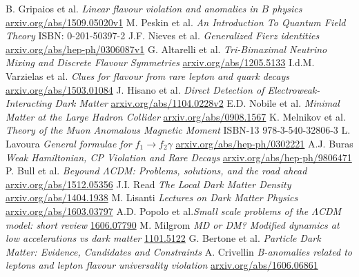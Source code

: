 \documentclass[11pt,a4paper,twoside]{article}
\numberwithin{equation}{section}
\begin{document}
\begin{thebibliography}{xxx}
 B. Gripaios et al. \textit{Linear flavour violation and anomalies in $B$ physics} \href{http://arxiv.org/abs/1509.05020v1}{arxiv.org/abs/1509.05020v1}
 M. Peskin et al. \textit{An Introduction To Quantum Field Theory} ISBN: 0-201-50397-2
 J.F. Nieves et al. \textit{Generalized Fierz identities} \href{http://arxiv.org/abs/hep-ph/0306087v1}{arxiv.org/abs/hep-ph/0306087v1}
 G. Altarelli et al. \textit{Tri-Bimaximal Neutrino Mixing and Discrete Flavour Symmetries} \href{https://arxiv.org/abs/1205.5133}{arxiv.org/abs/1205.5133}
 I.d.M. Varzielas et al. \textit{Clues for flavour from rare lepton and quark decays} \href{https://arxiv.org/abs/1503.01084}{arxiv.org/abs/1503.01084}
 J. Hisano et al. \textit{Direct Detection of Electroweak-Interacting Dark Matter} \href{https://arxiv.org/abs/1104.0228v2}{arxiv.org/abs/1104.0228v2}
 E.D. Nobile et al. \textit{Minimal Matter at the Large Hadron Collider} \href{http://arxiv.org/abs/0908.1567}{arxiv.org/abs/0908.1567}
 K. Melnikov et al. \textit{Theory of the Muon Anomalous Magnetic Moment} ISBN-13 978-3-540-32806-3
 L. Lavoura \textit{General formulae for $f_1\rightarrow f_2 \gamma$} \href{http://arxiv.org/abs/hep-ph/0302221}{arxiv.org/abs/hep-ph/0302221}
 A.J. Buras \textit{Weak Hamiltonian, CP Violation and Rare Decays} \href{http://arxiv.org/abs/hep-ph/9806471}{arxiv.org/abs/hep-ph/9806471}
 P. Bull et al. \textit{Beyound $\Lambda$CDM: Problems, solutions, and the road ahead} \href{http://arxiv.org/abs/1512.05356}{arxiv.org/abs/1512.05356}
 J.I. Read \textit{The Local Dark Matter Density} \href{http://arxiv.org/abs/1404.1938}{arxiv.org/abs/1404.1938}
 M. Lisanti \textit{Lectures on Dark Matter Physics} \href{https://arxiv.org/abs/1603.03797}{arxiv.org/abs/1603.03797}
 A.D. Popolo et al.\textit{Small scale problems of the $\Lambda$CDM model: short review} \href{https://arxiv.org/abs/1606.07790}{1606.07790}
 M. Milgrom \textit{MD or DM? Modified dynamics at low accelerations vs dark matter} \href{https://arxiv.org/abs/1101.5122}{1101.5122}
 G. Bertone et al. \textit{Particle Dark Matter: Evidence, Candidates and Constraints} 
 A. Crivellin \textit{B-anomalies related to leptons and lepton flavour universality violation} \href{https://arxiv.org/abs/1606.06861}{arxiv.org/abs/1606.06861}

\end{thebibliography}
\end{document}
